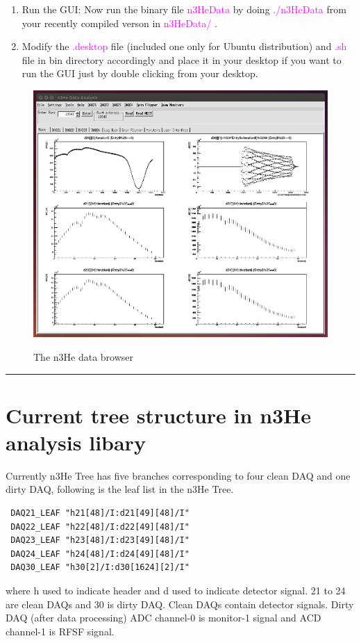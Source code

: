 \documentclass[12pt]{article}
\begin{document}
\begin{enumerate}
\item Run the GUI:
Now run the binary file \textcolor{magenta}{n3HeData} by doing \textcolor{magenta}{./n3HeData} from your recently compiled verson in \textcolor{magenta}{n3HeData/} .

\item Modify the \textcolor{magenta}{.desktop} file (included one only for Ubuntu distribution) and \textcolor{magenta}{.sh} file in bin directory accordingly and place it in your desktop if you want to run the GUI just by double clicking from your desktop.

\end{enumerate}

\begin{figure}[htb]
\centering
\includegraphics[width=6in]{data_browser.png}\\
\caption{The n3He data browser}\label{f2}
\end{figure}

\noindent
{\color{red} \rule{\linewidth}{1mm} }
 
\newpage
\section{Current tree structure in n3He analysis libary}

Currently n3He Tree has five branches corresponding to four clean DAQ and one dirty DAQ, following is the leaf list in the n3He Tree. 
\begin{lstlisting}
 DAQ21_LEAF "h21[48]/I:d21[49][48]/I"
 DAQ22_LEAF "h22[48]/I:d22[49][48]/I"
 DAQ23_LEAF "h23[48]/I:d23[49][48]/I"
 DAQ24_LEAF "h24[48]/I:d24[49][48]/I"
 DAQ30_LEAF "h30[2]/I:d30[1624][2]/I"
\end{lstlisting}
where h used to indicate header and d used to indicate detector signal. 21 to 24 are clean DAQs and 30 is dirty DAQ. Clean DAQs contain detector signals. Dirty DAQ (after data processing) ADC channel-0 is monitor-1 signal and ACD channel-1 is RFSF signal. 
\end{document}
